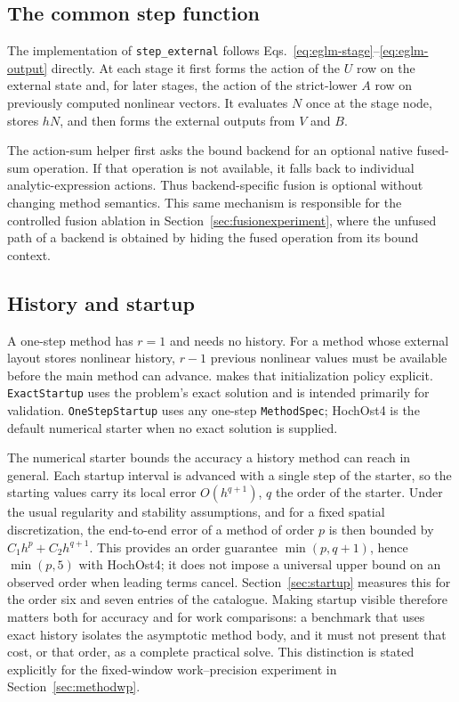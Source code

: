 \subsection{The common step function}

The implementation of \texttt{step\_external} follows
Eqs.~\eqref{eq:eglm-stage}--\eqref{eq:eglm-output} directly.  At each stage it
first forms the action of the $U$ row on the external state and, for later
stages, the action of the strict-lower $A$ row on previously computed nonlinear
vectors.  It evaluates $N$ once at the stage node, stores $hN$, and then forms
the external outputs from $V$ and $B$.

The action-sum helper first asks the bound backend for an optional native
fused-sum operation.  If that operation is not available, it falls back to
individual analytic-expression actions.  Thus backend-specific fusion is
optional without changing method semantics.  This same mechanism is responsible
for the controlled fusion ablation in Section~\ref{sec:fusionexperiment}, where
the unfused path of a backend is obtained by hiding the fused operation from
its bound context.

\subsection{History and startup}

A one-step method has $r=1$ and needs no history.  For a method whose
external layout stores nonlinear history, $r-1$ previous nonlinear values must
be available before the main method can advance.  \pkg{} makes that
initialization policy explicit.  \texttt{ExactStartup} uses the problem's exact
solution and is intended primarily for validation.  \texttt{OneStepStartup}
uses any one-step \texttt{MethodSpec}; HochOst4 is the default numerical starter
when no exact solution is supplied.

The numerical starter bounds the accuracy a history method can reach in
general.  Each startup interval is advanced with a single step of the starter,
so the starting values carry its local error $O(h^{q+1})$, $q$ the order of the
starter.  Under the usual regularity and stability assumptions, and for a fixed
spatial discretization, the end-to-end error of a method of order $p$ is then
bounded by $C_1h^p+C_2h^{q+1}$.  This provides an order guarantee
$\min(p,q+1)$, hence $\min(p,5)$ with HochOst4; it does not impose a
universal upper bound on an observed order when leading terms cancel.  Section~\ref{sec:startup} measures this for the order six and seven
entries of the catalogue.  Making startup visible therefore matters both for accuracy
and for work comparisons: a benchmark that uses exact history isolates the
asymptotic method body, and it must not present that cost, or that order, as a
complete practical solve.  This distinction is stated explicitly for the
fixed-window work--precision experiment in Section~\ref{sec:methodwp}.

